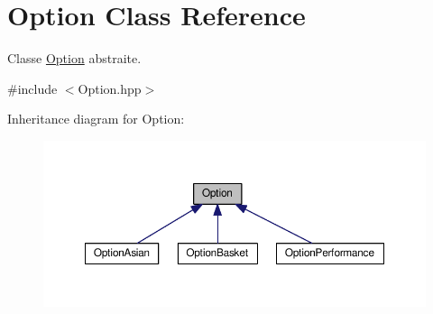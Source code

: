 \hypertarget{classOption}{\section{Option Class Reference}
\label{classOption}
}


Classe \hyperlink{classOption}{Option} abstraite.  




{\ttfamily \#include $<$Option.\-hpp$>$}



Inheritance diagram for Option\-:\nopagebreak
\begin{figure}[H]
\begin{center}
\leavevmode
\includegraphics[width=350pt]{classOption__inherit__graph}
\end{center}
\end{figure}
